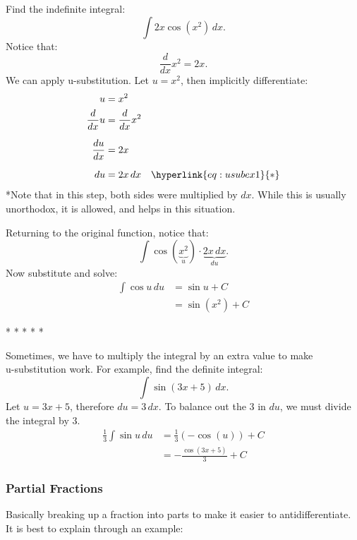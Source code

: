 \documentclass[12pt]{article}
\begin{document}
\noindent Find the indefinite integral:
\[ \int 2x \cos(x^2) \, dx. \]
\newline
Notice that:
\[ \frac{d}{dx} x^2 = 2x. \]
We can apply u-substitution. Let $u = x^2$, then implicitly differentiate:
\begin{align*}
    u              & = x^2                                      \\
    \frac{d}{dx} u & = \frac{d}{dx} x^2                         \\[6pt]
    \frac{du}{dx}  & = 2x                                       \\[6pt]
    du             & = 2x \, dx \quad \hyperlink{eq:usubex1}{*}
\end{align*}
\hypertarget{eq:usubex1}{*}Note that in this step, both sides were multiplied by $dx$. While this is usually unorthodox, it is allowed, and helps in this situation.
\bigskip

\noindent Returning to the original function, notice that:
\[ \int \cos(\underbrace{x^2}_{u}) \cdot \underbrace{2x \, dx}_{du}. \]
Now substitute and solve:
\begin{align*}
    \int \cos{u} \, du & = \sin{u} + C   \\
                       & = \sin(x^2) + C
\end{align*}
\begin{center}
    * * * * *
\end{center}

Sometimes, we have to multiply the integral by an extra value to make \\u-substitution work. For example, find the definite integral: %
\[ \int \sin(3x+5) \, dx. \]
Let $u = 3x+5$, therefore $du = 3 \, dx$. To balance out the $3$ in $du$, we must divide the integral by $3$.
\begin{align*}
    \frac{1}{3} \int \sin{u} \, du & = \frac{1}{3} \left( -\cos(u) \right) + C \\[6pt]
                                   & = -\frac{\cos(3x+5)}{3} + C
\end{align*}

\subsubsection{Partial Fractions} %
Basically breaking up a fraction into parts to make it easier to antidifferentiate. It is best to explain through an example:
\end{document}
